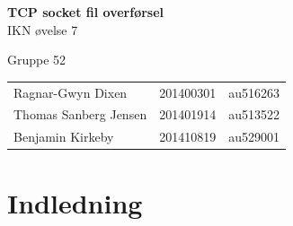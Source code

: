 \documentclass[12pt,fleqn,a4paper]{report}
\begin{document}
	

\begingroup
\thispagestyle{empty}
\centering
\vspace*{5cm}
\par\normalfont\fontsize{35}{35}\sffamily\selectfont
\textbf{TCP socket fil overførsel}\\
{\LARGE IKN øvelse 7}\par
{\LARGE Gruppe 52}\par
\vspace*{1cm}
{\small
\begin{center}
\begin{tabu} to 1 \textwidth { X[l,1]  X[c,1] X[c,1] }
	Ragnar-Gwyn Dixen & 201400301 & au516263\\
	Thomas Sanberg Jensen & 201401914 & au513522\\
	Benjamin Kirkeby & 201410819 & au529001\\
	\end{tabu}
\end{center}}
\endgroup
\newpage


\tableofcontents{}
\newpage

\chapter{Indledning}
\end{document}
